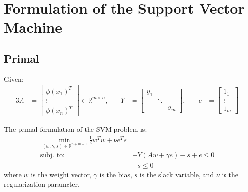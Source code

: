 \chapter{Formulation of the Support Vector Machine}

\section{Primal}\label{sec:primal}

Given:
\begin{alignat*}{3}
	A                                 & = \begin{bmatrix}
		                                      \phi\left(x_1\right)^T \\
		                                      \vdots                 \\
		                                      \phi\left(x_n\right)^T
	                                      \end{bmatrix}
	\in \mathbb{R}^{m \times n},\quad &
	Y                                 & = \begin{bmatrix}
		                                      y_1             \\
		                                       & \ddots       \\
		                                       &        & y_m
	                                      \end{bmatrix},\quad       &
	e                                 & = \begin{bmatrix}
		                                      1_1    \\
		                                      \vdots \\
		                                      1_m
	                                      \end{bmatrix}
\end{alignat*}

The primal formulation of the SVM problem is:
\begin{align*}
	\min_{
		(w,\gamma,s) \in \mathbb{R}^{n+m+1}
	}
	\frac{1}{2} w^T w + \nu e^T s                        \\[1.5em]
	\text{subj. to: } & -Y(Aw + \gamma e) - s + e \leq 0 \\
	                  & -s \leq 0
\end{align*}
where $w$ is the weight vector, $\gamma$ is the bias, $s$ is the slack variable,
and $\nu$ is the regularization parameter.

